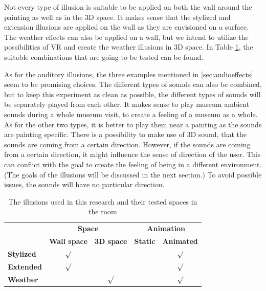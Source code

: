 \documentclass[a4paper]{article}
\begin{document}
Not every type of illusion is suitable to be applied on both the wall around the painting as well as in the 3D space. It makes sense that the stylized and extension illusions are applied on the wall as they are envisioned on a surface. The weather effects can also be applied on a wall, but we intend to utilize the possibilities of VR and create the weather illusions in 3D space. In Table \ref{tab:ourillusions}, the suitable combinations that are going to be tested can be found.

As for the auditory illusions, the three examples mentioned in \ref{sec:audioeffects} seem to be  promising choices. The different types of sounds can also be combined, but to keep this experiment as clean as possible, the different types of sounds will be separately played from each other. It makes sense to play museum ambient sounds during a whole museum visit, to create a feeling of a museum as a whole. As for the other two types, it is better to play them near a painting as the sounds are painting specific. There is a possibility to make use of 3D sound, that the sounds are coming from a certain direction. However, if the sounds are coming from a certain direction, it might influence the sense of direction of the user. This can conflict with the goal to create the feeling of being in a different environment. (The goals of the illusions will be discussed in the next section.) To avoid possible issues, the sounds will have no particular direction. %

\begin{table}
\centering
\begin{tabular}{l|cc|cc|}
\cline{2-5}
\textbf{} & \multicolumn{2}{c|}{\textbf{Space}} & \multicolumn{2}{c|}{\textbf{Animation}} \\ \cline{2-5} 
\textbf{} & \textbf{Wall space} & \textbf{3D space} & \textbf{Static} & \textbf{Animated} \\ \hline
\multicolumn{1}{|l|}{\textbf{Stylized}} & $\surd$ &  &  & $\surd$ \\ \cline{1-1}
\multicolumn{1}{|l|}{\textbf{Extended}} & $\surd$ &  &  & $\surd$ \\ \cline{1-1}
\multicolumn{1}{|l|}{\textbf{Weather}} &  & $\surd$ &  & $\surd$ \\ \hline
\end{tabular}
\caption{\label{tab:ourillusions}The illusions used in this research and their tested spaces in the room}
\end{table}
\end{document}
